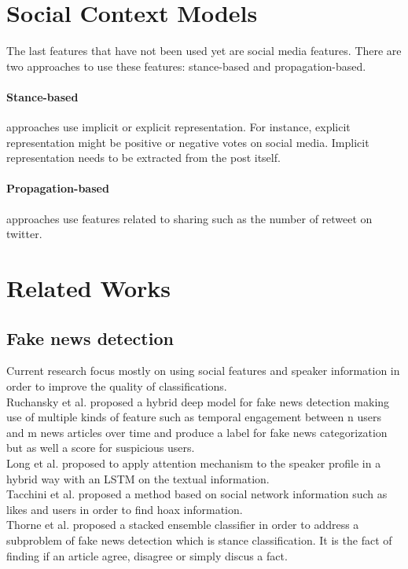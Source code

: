 \section{Social Context Models}
The last features that have not been used yet are social media features. There are two approaches to use these features: stance-based and propagation-based. 

\paragraph{Stance-based} approaches use implicit or explicit representation. For instance, explicit representation might be positive or negative votes on social media. Implicit representation needs to be extracted from the post itself. 

\paragraph{Propagation-based} approaches use features related to sharing such as the number of retweet on twitter. 

\section{Related Works}
\subsection{Fake news detection}
Current research focus mostly on using social features and speaker information in order to improve the quality of classifications.\\

Ruchansky et al.\cite{Ruchansky2017} proposed a hybrid deep model for fake news detection making use of multiple kinds of feature such as temporal engagement between n users and m news articles over time and produce a label for fake news categorization but as well a score for suspicious users.\\

Long et al. \cite{Long2017} proposed to apply attention mechanism to the speaker profile in a hybrid way with an LSTM on the textual information. \\

Tacchini et al.\cite{Tacchini2017} proposed a method based on social network information such as likes and users in order to find hoax information.\\

Thorne et al.\cite{Thorne2017} proposed a stacked ensemble classifier in order to address a subproblem of fake news detection which is stance classification. It is the fact of finding if an article agree, disagree or simply discus a fact. \\

